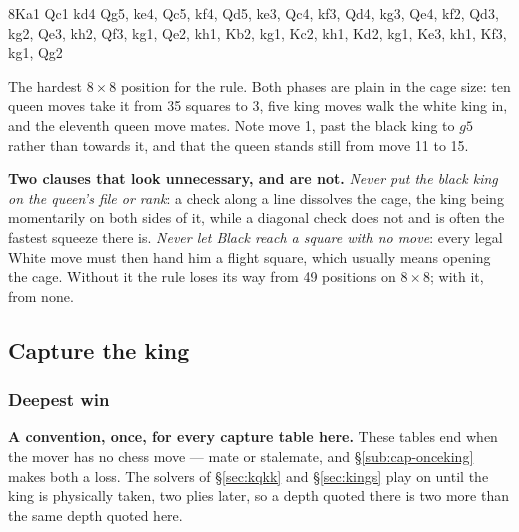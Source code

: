 \documentclass[10pt]{article}
\begin{document}
\medskip
\noindent
\begin{minipage}[t]{0.44\textwidth}
\begin{stepboard}[width=\linewidth,board=3.44cm,height=49mm,
  intro={wK $a1$, wQ $c1$, bK $d4$ --- mate in 10 with the table, 16 with the
  rule}]{8}{Ka1 Qc1 kd4}
  Qg5, ke4, Qc5, kf4, Qd5, ke3, Qc4, kf3, Qd4, kg3,
  Qe4, kf2, Qd3, kg2, Qe3, kh2, Qf3, kg1, Qe2, kh1,
  Kb2, kg1, Kc2, kh1, Kd2, kg1, Ke3, kh1, Kf3, kg1, Qg2
\end{stepboard}
\end{minipage}\hfill
\begin{minipage}[t]{0.52\textwidth}\vspace{0pt}\small
The hardest $8\times8$ position for the rule. Both phases are plain in the cage
size: ten queen moves take it from 35 squares to 3, five king moves walk the
white king in, and the eleventh queen move mates. Note move 1, past the black
king to $g5$ rather than towards it, and that the queen stands still from move
11 to 15.

\smallskip
\textbf{Two clauses that look unnecessary, and are not.} \emph{Never put the
black king on the queen's file or rank}: a check along a line dissolves the
cage, the king being momentarily on both sides of it, while a diagonal check
does not and is often the fastest squeeze there is. \emph{Never let Black reach
a square with no move}: every legal White move must then hand him a flight
square, which usually means opening the cage. Without it the rule loses its way
from 49 positions on $8\times8$; with it, from none.
\end{minipage}

\subsection{Capture the king}\label{sub:kqk-capture}

\subsubsection{Deepest win}\label{sub:kqk-cap-law}

\noindent
\textbf{A convention, once, for every capture table here.} These tables end
when the mover has no chess move --- mate or stalemate, and
\S\ref{sub:cap-onceking} makes both a loss. The solvers of \S\ref{sec:kqkk} and
\S\ref{sec:kings} play on until the king is physically taken, two plies later,
so a depth quoted there is two more than the same depth quoted here.
\end{document}

